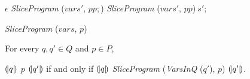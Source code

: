 \begin{algorithm}
  \begin{algorithmic}[1]
      \Case{$\epsilon$}
        \Return $\epsilon$
      \EndCase
            \Return \textit{SliceProgram} ($\mathit{vars}'$, $pp;$)
          \EndCase
            \Return \textit{SliceProgram} ($\mathit{vars}'$, $pp$)$\ s';$
          \EndCase
        \EndMatch
      \EndCase
    \EndMatch
  \end{algorithmic}
  \caption{\textit{SliceProgram} ($\mathit{vars}$, $p$)}
\end{algorithm}

\begin{theorem}
  For every $q, q' \in Q$ and $p \in P$,
  \begin{center}
  ${(\!|}{q}{|\!)}$ $p$ ${(\!|}{q'}{|\!)}$ if and only if
  ${(\!|}{q}{|\!)}$ \textit{SliceProgram} (\textit{VarsInQ} ($q'$), $p$)
  ${(\!|}{q'}{|\!)}$.
  \end{center}

\end{theorem}